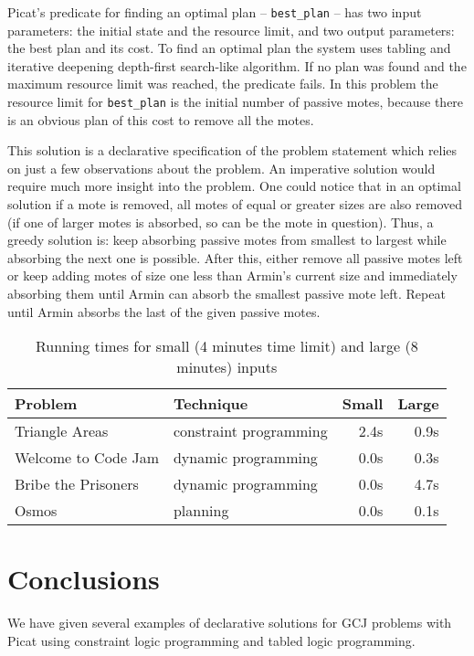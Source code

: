 \documentclass{llncs}
\begin{document}
Picat's predicate for finding an optimal plan -- \texttt{best\_plan} -- has two input parameters: the initial state and the resource limit, and two output parameters: the best plan and its cost. To find an optimal plan the system uses tabling and iterative deepening depth-first search-like algorithm. If no plan was found and the maximum resource limit was reached, the predicate fails.
In this problem the resource limit for \texttt{best\_plan} is the initial number of passive motes, because there is an obvious plan of this cost to remove all the motes.

This solution is a declarative specification of the problem statement which relies on just a few observations about the problem.
An imperative solution would require much more insight into the problem. One could notice that in an optimal solution if a mote is removed, all motes of equal or greater sizes are also removed (if one of larger motes is absorbed, so can be the mote in question). Thus, a greedy solution is: keep absorbing passive motes from smallest to largest while absorbing the next one is possible. After this, either remove all passive motes left or keep adding motes of size one less than Armin's current size and immediately absorbing them until Armin can absorb the smallest passive mote left. Repeat until Armin absorbs the last of the given passive motes.


\begin{table}
\centering
\caption{Running times for small (4 minutes time limit) and large (8 minutes) inputs\protect\footnotemark}
\label{table:times}
\begin{tabular}{llrr}
\hline
Problem               & Technique &  Small   & Large \\
\hline
Triangle Areas        & constraint programming      & 2.4s & 0.9s \\
Welcome to Code Jam   & dynamic programming         & 0.0s & 0.3s \\
Bribe the Prisoners   & dynamic programming         & 0.0s & 4.7s \\
Osmos                 & planning                    & 0.0s & 0.1s \\
\hline
\end{tabular}
\end{table}
\section{Conclusions}

We have given several examples of declarative solutions for GCJ problems with Picat using constraint logic programming and tabled logic programming.
\end{document}
